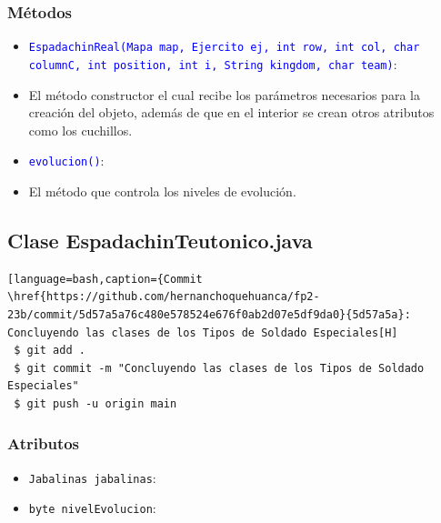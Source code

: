 \documentclass{article}
\begin{document}
\subsubsection{Métodos}
\begin{itemize}
    \item \texttt{\textcolor{blue}{EspadachinReal(Mapa map, Ejercito ej, int row, int col, char columnC, int position, int i, String kingdom, char team)}}: 
    \item El método constructor el cual recibe los parámetros necesarios para la creación del objeto, además de que en el interior se crean otros atributos como los cuchillos.
\end{itemize}

\begin{itemize}
    \item \texttt{\textcolor{blue}{evolucion()}}: 
    \item El método que controla los niveles de evolución. 
\end{itemize}



\subsection{Clase EspadachinTeutonico.java}
\begin{lstlisting}[language=bash,caption={Commit \href{https://github.com/hernanchoquehuanca/fp2-23b/commit/5d57a5a76c480e578524e676f0ab2d07e5df9da0}{5d57a5a}: Concluyendo las clases de los Tipos de Soldado Especiales[H]
 $ git add .
 $ git commit -m "Concluyendo las clases de los Tipos de Soldado Especiales"			
 $ git push -u origin main
\end{lstlisting}

\subsubsection{Atributos}
\begin{itemize}
    \item \texttt{Jabalinas jabalinas}: 
    \item \texttt{byte nivelEvolucion}: 
\end{itemize}

\end{document}
